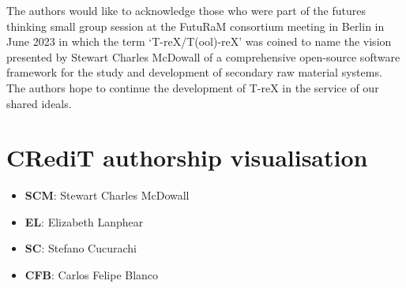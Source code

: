\documentclass[a4paper,fleqn]{cas-dc}
\begin{document}
The authors would like to acknowledge those who were part of the futures
thinking small group session at the FutuRaM consortium meeting in Berlin in
June 2023 in which the term `T-reX/T(ool)-reX' was coined to name the vision
presented by Stewart Charles McDowall of a comprehensive open-source software
framework for the study and development of secondary raw material systems. The
authors hope to continue the development of T-reX in the service of our shared
ideals.




\section*{CRediT authorship visualisation} %

\begin{itemize}
	\item \textbf{SCM}: Stewart Charles McDowall
	\item \textbf{EL}: Elizabeth Lanphear
	\item \textbf{SC}: Stefano Cucurachi
	\item \textbf{CFB}: Carlos Felipe Blanco
\end{itemize}
\end{document}

